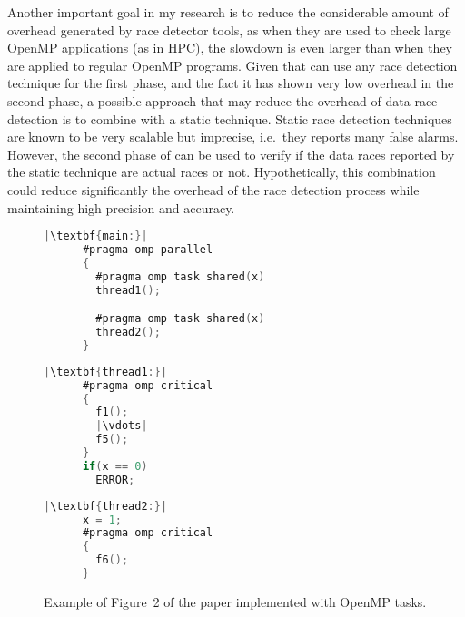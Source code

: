 \begin{refsection}
Another important goal in my research is to reduce the considerable amount of
overhead generated by race detector tools, as when they are used to check
large OpenMP applications (as in HPC), the slowdown is even larger than when
they are applied to regular OpenMP programs.
%
%
%
Given that \rfuz can use any race detection technique for the first phase, and
the fact it has shown very low overhead in the second phase, a possible
approach that may reduce the overhead of data race detection is to combine
\rfuz with a static technique.
%
Static race detection techniques are known to be very scalable but imprecise,
i.e.\ they reports many false alarms.
%
However, the second phase of \rfuz can be used to verify if the data races
reported by the static technique are actual races or not.
%
Hypothetically, this combination could reduce significantly the overhead of
the race detection process while maintaining high precision and accuracy.

\begin{figure}[H]
  \vspace{-10pt}
  \begin{minipage}[t]{0.35\textwidth}
    \begin{lstlisting}[language=C, xleftmargin=-30pt, xrightmargin=0pt]
      |\textbf{main:}|
      #pragma omp parallel
      {
        #pragma omp task shared(x)
        thread1();

        #pragma omp task shared(x)
        thread2();
      }
    \end{lstlisting}
  \end{minipage}
  \hfill
  \begin{minipage}[t]{0.3\textwidth}
    \begin{lstlisting}[language=C, xleftmargin=-15pt, xrightmargin=0pt]
      |\textbf{thread1:}|
      #pragma omp critical
      {
        f1();
        |\vdots|
        f5();
      }
      if(x == 0)
        ERROR;
    \end{lstlisting}
  \end{minipage}
  \hfill
  \begin{minipage}[t]{0.3\textwidth}
    \begin{lstlisting}[language=C, xleftmargin=-30pt, xrightmargin=0pt]
      |\textbf{thread2:}|
      x = 1;
      #pragma omp critical
      {
        f6();
      }
    \end{lstlisting}
  \end{minipage}
  \vspace{-10pt}
  \caption{Example of Figure~2 of the paper implemented with OpenMP tasks.}
  \label{fig:openmp3}
  \vspace{-15pt}
\end{figure}

\printbibliography

\end{refsection}

